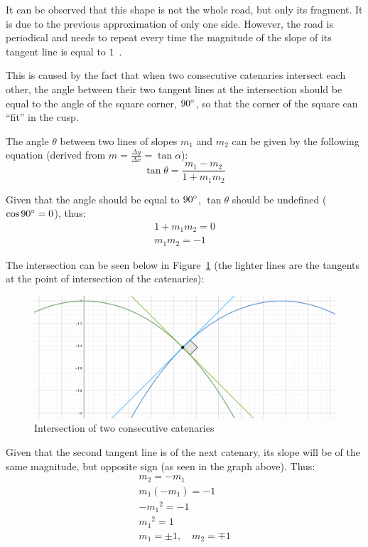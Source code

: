 \documentclass[12pt]{article}
\begin{document}
        It can be observed that this shape is not the whole road, but only its fragment. It is due to the previous approximation of only one side. However, the road is periodical and needs to repeat every time the magnitude of the slope of its tangent line is equal to $1$~\cite{Hall_Wagon_1992}.

        This is caused by the fact that when two consecutive catenaries intersect each other, the angle between their two tangent lines at the intersection should be equal to the angle of the square corner, $90\degree$, so that the corner of the square can ``fit'' in the cusp. 

        The angle $\theta$ between two lines of slopes $m_1$ and $m_2$ can be given by the following equation (derived from $m=\frac{\Delta y}{\Delta x}=\tan\alpha$):
        \begin{equation}\label{eq:lines_angle}
            \tan\theta = \frac{m_1 - m_2}{1 + m_1 m_2}
        \end{equation}

        Given that the angle should be equal to $90\degree$, $\tan\theta$ should be undefined ($\cos90\degree = 0$), thus:
        \begin{align}
            1 + m_1 m_2 = 0 \\
            m_1 m_2 = -1
        \end{align}

        The intersection can be seen below in Figure~\ref{fig:intersection} (the lighter lines are the tangents at the point of intersection of the catenaries):

        \begin{figure}[H]
            \centering
            \includegraphics[width=0.6\linewidth]{images/slope_1.png}
            \caption[Intersection of two consecutive catenaries]{Intersection of two consecutive catenaries\footnotemark}\label{fig:intersection}
        \end{figure}

        Given that the second tangent line is of the next catenary, its slope will be of the same magnitude, but opposite sign (as seen in the graph above). Thus:
        \begin{align}
            m_2 = - m_1 \label{eq:tangent_intersection} \\
            m_1 (-m_1) = -1 \\
            - {m_1}^2 = -1 \\
            {m_1}^2 = 1 \\
            m_1 = \pm 1, \quad m_2 = \mp 1
        \end{align} 
\end{document}
